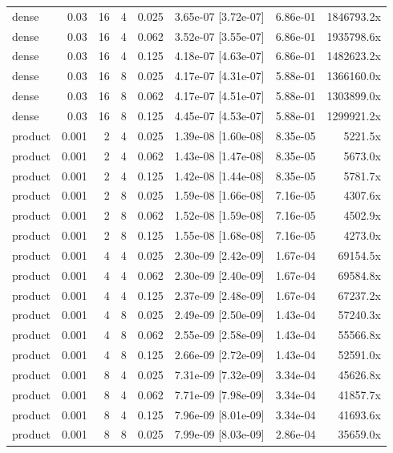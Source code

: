 \begin{tabular}{lrrrrrrr}
dense & 0.03 & 16 & 4 & 0.025 & 3.65e-07 [3.72e-07] & 6.86e-01 & 1846793.2x \\
dense & 0.03 & 16 & 4 & 0.062 & 3.52e-07 [3.55e-07] & 6.86e-01 & 1935798.6x \\
dense & 0.03 & 16 & 4 & 0.125 & 4.18e-07 [4.63e-07] & 6.86e-01 & 1482623.2x \\
dense & 0.03 & 16 & 8 & 0.025 & 4.17e-07 [4.31e-07] & 5.88e-01 & 1366160.0x \\
dense & 0.03 & 16 & 8 & 0.062 & 4.17e-07 [4.51e-07] & 5.88e-01 & 1303899.0x \\
dense & 0.03 & 16 & 8 & 0.125 & 4.45e-07 [4.53e-07] & 5.88e-01 & 1299921.2x \\
product & 0.001 & 2 & 4 & 0.025 & 1.39e-08 [1.60e-08] & 8.35e-05 & 5221.5x \\
product & 0.001 & 2 & 4 & 0.062 & 1.43e-08 [1.47e-08] & 8.35e-05 & 5673.0x \\
product & 0.001 & 2 & 4 & 0.125 & 1.42e-08 [1.44e-08] & 8.35e-05 & 5781.7x \\
product & 0.001 & 2 & 8 & 0.025 & 1.59e-08 [1.66e-08] & 7.16e-05 & 4307.6x \\
product & 0.001 & 2 & 8 & 0.062 & 1.52e-08 [1.59e-08] & 7.16e-05 & 4502.9x \\
product & 0.001 & 2 & 8 & 0.125 & 1.55e-08 [1.68e-08] & 7.16e-05 & 4273.0x \\
product & 0.001 & 4 & 4 & 0.025 & 2.30e-09 [2.42e-09] & 1.67e-04 & 69154.5x \\
product & 0.001 & 4 & 4 & 0.062 & 2.30e-09 [2.40e-09] & 1.67e-04 & 69584.8x \\
product & 0.001 & 4 & 4 & 0.125 & 2.37e-09 [2.48e-09] & 1.67e-04 & 67237.2x \\
product & 0.001 & 4 & 8 & 0.025 & 2.49e-09 [2.50e-09] & 1.43e-04 & 57240.3x \\
product & 0.001 & 4 & 8 & 0.062 & 2.55e-09 [2.58e-09] & 1.43e-04 & 55566.8x \\
product & 0.001 & 4 & 8 & 0.125 & 2.66e-09 [2.72e-09] & 1.43e-04 & 52591.0x \\
product & 0.001 & 8 & 4 & 0.025 & 7.31e-09 [7.32e-09] & 3.34e-04 & 45626.8x \\
product & 0.001 & 8 & 4 & 0.062 & 7.71e-09 [7.98e-09] & 3.34e-04 & 41857.7x \\
product & 0.001 & 8 & 4 & 0.125 & 7.96e-09 [8.01e-09] & 3.34e-04 & 41693.6x \\
product & 0.001 & 8 & 8 & 0.025 & 7.99e-09 [8.03e-09] & 2.86e-04 & 35659.0x \\

\end{tabular}
